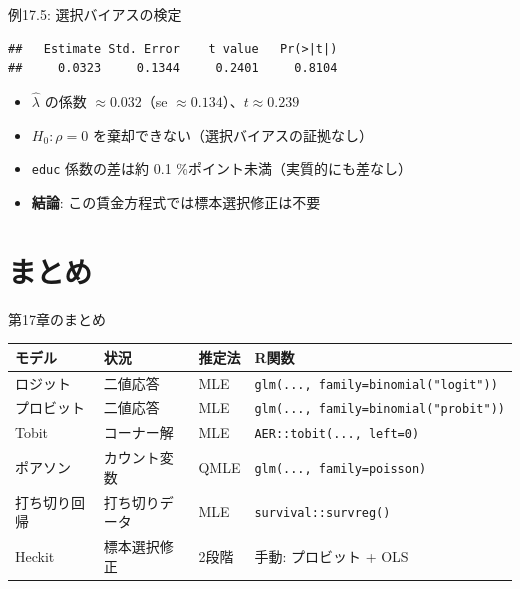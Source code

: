 \documentclass[
  ignorenonframetext,
]{beamer}
\newenvironment{Shaded}{\begin{snugshade}}{\end{snugshade}}
\newcommand{\CommentTok}[1]{\textcolor[rgb]{0.56,0.35,0.01}{\textit{#1}}}
\newcommand{\DecValTok}[1]{\textcolor[rgb]{0.00,0.00,0.81}{#1}}
\newcommand{\FunctionTok}[1]{\textcolor[rgb]{0.00,0.00,0.00}{#1}}
\newcommand{\NormalTok}[1]{#1}
\newcommand{\SpecialCharTok}[1]{\textcolor[rgb]{0.00,0.00,0.00}{#1}}
\newcommand{\StringTok}[1]{\textcolor[rgb]{0.31,0.60,0.02}{#1}}
\providecommand{\tightlist}{%
  \setlength{\itemsep}{0pt}\setlength{\parskip}{0pt}}
\begin{document}
\begin{frame}[fragile]{例17.5: 選択バイアスの検定}
\protect\hypertarget{ux4f8b17.5-ux9078ux629eux30d0ux30a4ux30a2ux30b9ux306eux691cux5b9a}{}
\footnotesize

\begin{Shaded}
\end{Shaded}

\begin{verbatim}
##   Estimate Std. Error    t value   Pr(>|t|) 
##     0.0323     0.1344     0.2401     0.8104
\end{verbatim}

\normalsize

\begin{itemize}
\tightlist
\item
  \(\hat{\lambda}\) の係数 \(\approx 0.032\)（se
  \(\approx 0.134\)）、\(t \approx 0.239\)
\item
  \(H_0: \rho = 0\) を棄却できない（選択バイアスの証拠なし）
\item
  \texttt{educ} 係数の差は約 0.1 \%ポイント未満（実質的にも差なし）
\item
  \textbf{結論}: この賃金方程式では標本選択修正は不要
\end{itemize}
\end{frame}

\hypertarget{ux307eux3068ux3081}{%
\section{まとめ}\label{ux307eux3068ux3081}}

\begin{frame}[fragile]{第17章のまとめ}
\protect\hypertarget{ux7b2c17ux7ae0ux306eux307eux3068ux3081}{}
\scriptsize

\begin{longtable}[]{@{}llll@{}}
\toprule
モデル & 状況 & 推定法 & R関数 \\
\midrule
\endhead
ロジット & 二値応答 & MLE &
\texttt{glm(...,\ family=binomial("logit"))} \\
プロビット & 二値応答 & MLE &
\texttt{glm(...,\ family=binomial("probit"))} \\
Tobit & コーナー解 & MLE & \texttt{AER::tobit(...,\ left=0)} \\
ポアソン & カウント変数 & QMLE & \texttt{glm(...,\ family=poisson)} \\
打ち切り回帰 & 打ち切りデータ & MLE & \texttt{survival::survreg()} \\
Heckit & 標本選択修正 & 2段階 & 手動: プロビット + OLS \\
\bottomrule
\end{longtable}

\normalsize
\end{frame}
\end{document}

